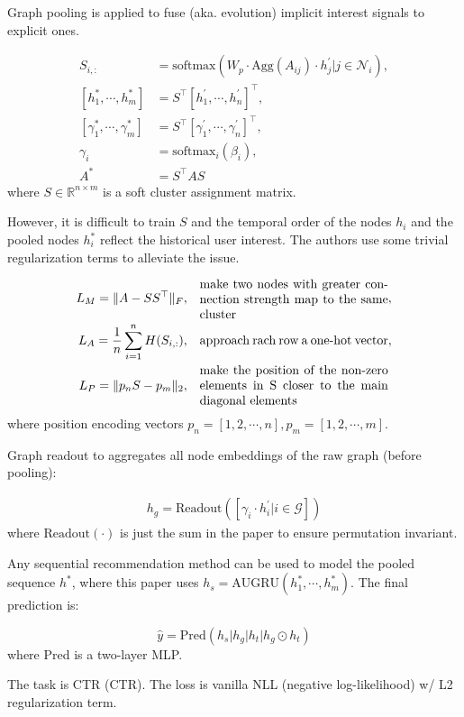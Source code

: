 Graph pooling is applied to fuse (aka. evolution) implicit interest signals to explicit ones.

\begin{align}
	S_{i,:} &= \text{softmax} (W_p \cdot \text{Agg} (A_{ij}) \cdot h_j^\prime | j \in \mathcal{N}_i), \\
	[h_1^*, \cdots, h_m^*] &= S^\top [h_1^\prime, \cdots, h_n^\prime]^\top, \\
	[\gamma_1^*, \cdots, \gamma_m^*] &= S^\top [\gamma_1^\prime, \cdots, \gamma_n^\prime]^\top, \\
	\gamma_i &= \text{softmax}_i (\beta_i), \\
	A^* &= S^\top A S
\end{align}
where $S \in \mathbb{R}^{n \times m}$ is a soft cluster assignment matrix.

However, it is difficult to train $S$ and the temporal order of the nodes $h_i$ and the pooled nodes $h_i^*$ reflect the historical user interest.
The authors use some trivial regularization terms to alleviate the issue.

\begin{align}
	L_M = \lVert A - SS^\top \rVert_F, \quad &\parbox{15em}{ make two nodes with greater connection strength map to the same cluster}, \\
	L_A = \frac{1}{n} \sum_{i=1}^n H(S_{i,:}), \quad &\parbox{15em}{ approach rach row a one-hot vector}, \\
	L_P = \lVert p_n S - p_m \rVert_2, \quad &\parbox{15em}{ make the position of the non-zero elements in S closer to the main diagonal elements}
\end{align}
where position encoding vectors $p_n = [1, 2, \cdots, n], p_m = [1, 2, \cdots, m]$.

Graph readout to aggregates all node embeddings of the raw graph (before pooling):

\begin{align}
	h_g = \text{Readout} ([\gamma_i \cdot h^\prime_i | i \in \mathcal{G}])
\end{align}
where $\text{Readout}(\cdot)$ is just the sum in the paper to ensure permutation invariant.

Any sequential recommendation method can be used to model the pooled sequence $h^*$, where this paper uses $h_s = \text{AUGRU}(h_1^*, \cdots, h_m^*)$.
The final prediction is:

\begin{equation}
	\hat{y} = \text{Pred} (h_s \vert h_g \vert h_t \vert h_g \odot h_t)
\end{equation}
where Pred is a two-layer MLP.

The task is CTR (CTR).
The loss is vanilla NLL (negative log-likelihood) w/ L2 regularization term.